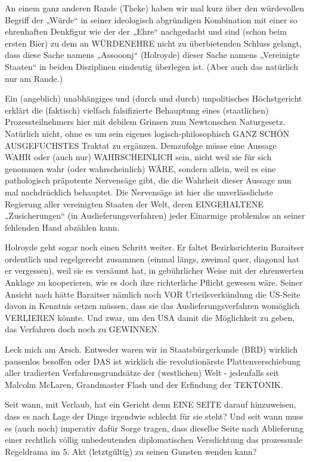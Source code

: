 \begin{multicols}{2}
An einem ganz anderen Rande (Theke) haben wir mal
kurz über den würdevollen Begriff der „Würde“ in seiner ideologisch abgründigen Kombination mit einer so
ehrenhaften Denkfigur wie der der „Ehre“ nachgedacht
und sind (schon beim ersten Bier) zu dem an WÜRDENEHRE nicht zu überbietenden Schluss gelangt, dass diese Sache namens „Assooonj“ (Holroyde) dieser Sache
namens „Vereinigte Staaten“ in beiden Disziplinen eindeutig überlegen ist. (Aber auch das natürlich nur am
Rande.)

Ein (angeblich) unabhängiges und (durch und durch)
unpolitisches Höchstgericht erklärt die (faktisch) vielfach falsifizierte Behauptung eines (staatlichen) Prozessteilnehmers hier mit debilem Grinsen zum Newtonschen Naturgesetz. Natürlich nicht, ohne es um sein
eigenes logisch-philosophisch GANZ SCHÖN AUSGEFUCHSTES Traktat zu ergänzen. Demzufolge müsse
eine Aussage WAHR oder (auch nur) WAHRSCHEINLICH sein, nicht weil sie für sich genommen wahr (oder
wahrscheinlich) WÄRE, sondern allein, weil es eine pathologisch präpotente Nervensäge gibt, die die Wahrheit
dieser Aussage nun mal nachdrücklich behauptet. Die
Nervensäge ist hier die unverlässlichste Regierung aller vereinigten Staaten der Welt, deren EINGEHALTENE
„Zusicherungen“ (in Auslieferungsverfahren) jeder Einarmige problemlos an seiner fehlenden Hand abzählen
kann.

Holroyde geht sogar noch einen Schritt weiter. Er faltet
Bezirksrichterin Baraitser ordentlich und regelgerecht
zusammen (einmal längs, zweimal quer, diagonal hat er
vergessen), weil sie es versäumt hat, in gebührlicher Weise mit der ehrenwerten Anklage zu kooperieren, wie es
doch ihre richterliche Pflicht gewesen wäre. Seiner Ansicht nach hätte Baraitser nämlich noch VOR Urteilsverkündung die US-Seite davon in Kenntnis setzen müssen,
dass sie das Auslieferungsverfahren womöglich VERLIEREN könnte. Und zwar, um den USA damit die Möglichkeit zu geben, das Verfahren doch noch zu GEWINNEN.

Leck mich am Arsch. Entweder waren wir in Staatsbürgerkunde (BRD) wirklich pausenlos besoffen oder DAS
ist wirklich die revolutionärste Plattenverschiebung aller
tradierten Verfahrensgrundsätze der (westlichen) Welt
- jedenfalls seit Malcolm McLaren, Grandmaster Flash
und der Erfindung der TEKTONIK.

Seit wann, mit Verlaub, hat ein Gericht denn EINE SEITE
darauf hinzuweisen, dass es nach Lage der Dinge irgendwie schlecht für sie steht? Und seit wann muss es (auch
noch) imperativ dafür Sorge tragen, dass dieselbe Seite
nach Ablieferung einer rechtlich völlig unbedeutenden
diplomatischen Versdichtung das prozessuale Regeldrama im 5. Akt (letztgültig) zu seinen Gunsten wenden
kann?


\end{multicols}
